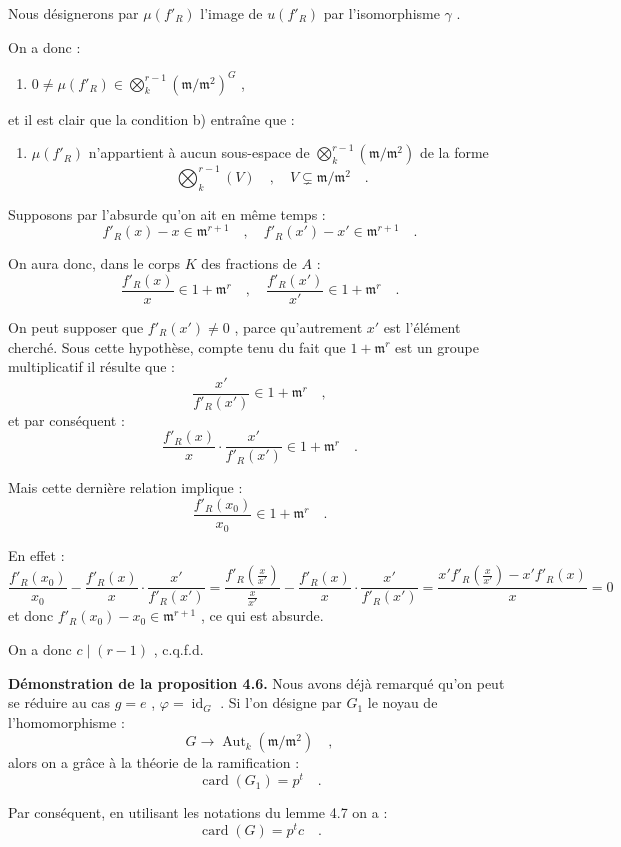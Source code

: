 \documentclass[11pt]{article}
\providecommand{\fm}{\mathfrak{m}}
\providecommand{\id}{\operatorname{id}}
\providecommand{\id}{\operatorname{id}}
\providecommand{\id}{\operatorname{id}}
\providecommand{\Aut}{\operatorname{Aut}}
\providecommand{\id}{\operatorname{id}}
\providecommand{\id}{\operatorname{id}}
\providecommand{\fm}{\mathfrak m}
\providecommand{\card}{\operatorname{card}}
\providecommand{\Aut}{\operatorname{Aut}}
\providecommand{\id}{\operatorname{id}}
\begin{document}
Nous désignerons par $\mu(f'_R)$ l'image de $u(f'_R)$ par l'isomorphisme $\gamma$ .

On a donc :
\begin{enumerate}
\item[1)] $0 \neq \mu(f'_R) \in \bigotimes_k^{r-1}(\fm/\fm^2)^G$ ,
\end{enumerate}
et il est clair que la condition b) entraîne que :
\begin{enumerate}
\item[2)] $\mu(f'_R)$ n'appartient à aucun sous-espace de $\bigotimes_k^{r-1}(\fm/\fm^2)$ de la forme
\[
\bigotimes_k^{r-1}(V) \quad , \quad V \subsetneq \fm/\fm^2 \quad .
\]
\end{enumerate}

Supposons par l'absurde qu'on ait en même temps :
\[
f'_R(x) - x \in \fm^{r+1} \quad , \quad f'_R(x') - x' \in \fm^{r+1} \quad .
\]

On aura donc, dans le corps $K$ des fractions de $A$ :
\[
\frac{f'_R(x)}{x} \in 1 + \fm^r \quad , \quad \frac{f'_R(x')}{x'} \in 1 + \fm^r \quad .
\]

On peut supposer que $f'_R(x') \neq 0$ , parce qu'autrement $x'$ est l'élément cherché. Sous cette hypothèse, compte tenu du fait que $1 + \fm^r$ est un groupe multiplicatif il résulte que :
\[
\frac{x'}{f'_R(x')} \in 1 + \fm^r \quad ,
\]
et par conséquent :
\[
\frac{f'_R(x)}{x} \cdot \frac{x'}{f'_R(x')} \in 1 + \fm^r \quad .
\]

Mais cette dernière relation implique :
\[
\frac{f'_R(x_0)}{x_0} \in 1 + \fm^r \quad .
\]

En effet :
\[
\frac{f'_R(x_0)}{x_0} - \frac{f'_R(x)}{x} \cdot \frac{x'}{f'_R(x')} = \frac{f'_R(\frac{x}{x'})}{\frac{x}{x'}} - \frac{f'_R(x)}{x} \cdot \frac{x'}{f'_R(x')} = \frac{x' f'_R(\frac{x}{x'}) - x' f'_R(x)}{x} = 0
\]
et donc $f'_R(x_0) - x_0 \in \fm^{r+1}$ , ce qui est absurde.

On a donc $c \mid (r-1)$ , c.q.f.d.

\medskip

\noindent
\textbf{Démonstration de la proposition 4.6.} Nous avons déjà remarqué qu'on peut se réduire au cas $g = e$ , $\varphi = \id_G$ . Si l'on désigne par $G_1$ le noyau de l'homomorphisme :
\[
G \longrightarrow \Aut_k(\fm/\fm^2) \quad ,
\]
alors on a grâce à la théorie de la ramification :
\[
\card(G_1) = p^t \quad .
\]

Par conséquent, en utilisant les notations du lemme 4.7 on a :
\[
\card(G) = p^t c \quad .
\]
\end{document}
